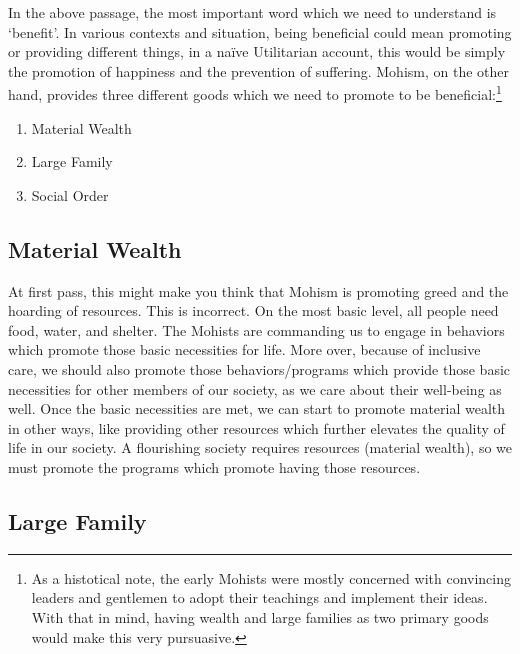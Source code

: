 
In the above passage, the most important word which we need to understand is `benefit'. In various contexts and situation, being beneficial could mean promoting or providing different things, in a na\"ive Utilitarian account, this would be simply the promotion of happiness and the prevention of suffering. Mohism, on the other hand, provides three different goods which we need to promote to be beneficial:\footnote{As a histotical note, the early Mohists were mostly concerned with convincing leaders and gentlemen to adopt their teachings and implement their ideas. With that in mind, having wealth and large families as two primary goods would make this very pursuasive.}

\begin{enumerate}
\item Material Wealth
\item Large Family
\item Social Order
\end{enumerate}

\subsection{Material Wealth}

At first pass, this might make you think that Mohism is promoting greed and the hoarding of resources. This is incorrect. On the most basic level, all people need food, water, and shelter. The Mohists are commanding us to engage in behaviors which promote those basic necessities for life.\autocite[52]{VanNorden1} More over, because of inclusive care, we should also promote those behaviors/programs which provide those basic necessities for other members of our society, as we care about their well-being as well. Once the basic necessities are met, we can start to promote material wealth in other ways, like providing other resources which further elevates the quality of life in our society. A flourishing society requires resources (material wealth), so we must promote the programs which promote having those resources.

\subsection{Large Family}

